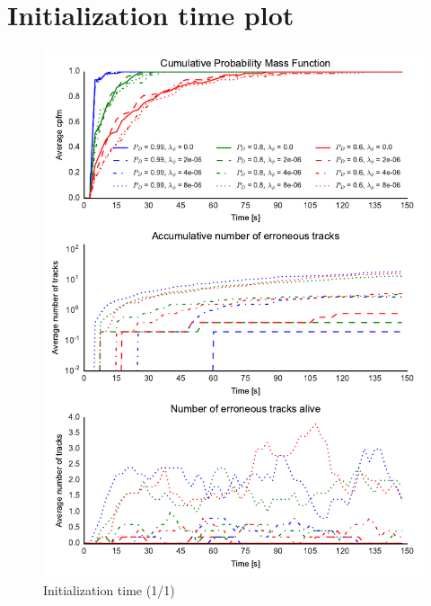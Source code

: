 
\chapter{Initialization time plot}
\begin{figure}
\centering
\includegraphics{Figures/plots/Scenario0_Init-Time(1-1).pdf}
\caption{Initialization time (1/1)}\label{fig:init_time_1-1}
\end{figure}

